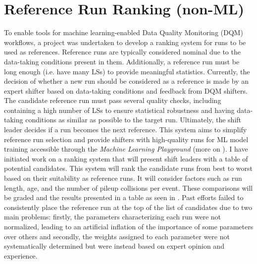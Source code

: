 \section{Reference Run Ranking (non-ML)}


To enable tools for machine learning-enabled Data Quality Monitoring (DQM) workflows, a project was undertaken to develop a ranking system for runs to be used as references. Reference runs are typically considered nominal due to the data-taking conditions present in them. Additionally, a reference run must be long enough (i.e. have many LSs) to provide meaningful statistics. Currently, the decision of whether a new run should be considered as a reference is made by an expert shifter based on data-taking conditions and feedback from DQM shifters. The candidate reference run must pass several quality checks, including containing a high number of LSs to ensure statistical robustness and having data-taking conditions as similar as possible to the target run.
Ultimately, the shift leader decides if a run becomes the next reference. This system aims to simplify reference run selection and provide shifters with high-quality runs for ML model training accessible through the \textit{Machine Learning Playground} (more on ). I have initiated work on a ranking system that will present shift leaders with a table of potential candidates. This system will rank the candidate runs from best to worst based on their suitability as reference runs. It will consider factors such as run length, age, and the number of pileup collisions per event. These comparisons will be graded and the results presented in a table as seen in .
Past efforts failed to consistently place the reference run at the top of the list of candidates due to two main problems: firstly, the parameters characterizing each run were not normalized, leading to an artificial inflation of the importance of some parameters over others and secondly, the weights assigned to each parameter were not systematically determined but were instead based on expert opinion and experience.
